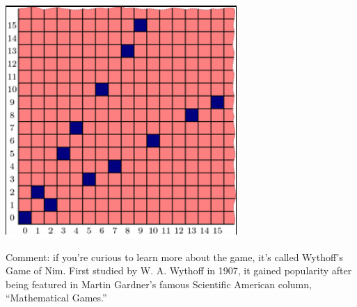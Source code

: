 \documentclass{article}
\begin{document}
\begin{center}
    \includegraphics[scale=0.8]{images/wythoff_game.png}
\end{center}

Comment: if you’re curious to learn more about the game, it’s called Wythoff’s Game of Nim. First studied by W. A. Wythoff in 1907, it gained popularity after being featured in Martin Gardner’s famous Scientific American column, “Mathematical Games.”
\end{document}
